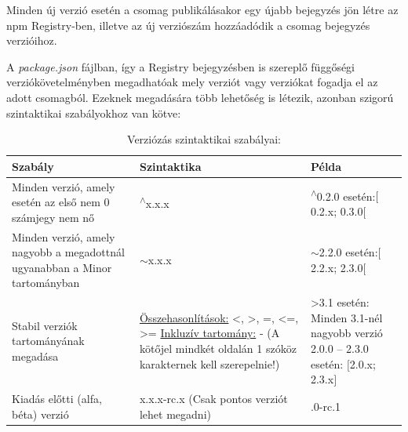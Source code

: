 	Minden új verzió esetén a csomag publikálásakor egy újabb bejegyzés jön létre az npm Registry-ben, illetve az új verziószám hozzáadódik a csomag bejegyzés verzióihoz.
	
	A \emph{package.json} fájlban, így a Registry bejegyzésben is szereplő függőségi verziókövetelményben megadhatóak mely verziót vagy verziókat fogadja el az adott csomagból. Ezeknek megadására több lehetőség is létezik, azonban szigorú szintaktikai szabályokhoz van kötve:
	\begin{table}[h]
		\centering
		\caption{Verziózás szintaktikai szabályai:}
		\label{tab:sem-ver-pt1}
	\begin{tabularx}{\textwidth} { 
			| >{\centering\arraybackslash}X 
			| >{\centering\arraybackslash}X 
			| >{\centering\arraybackslash}X | }
		\hline
		\textbf{Szabály} & \textbf{Szintaktika} & \textbf{Példa} \\
		\hline
		Minden verzió, amely esetén az első nem 0 számjegy nem nő & \textsuperscript{$\wedge$}x.x.x & \textsuperscript{$\wedge$}0.2.0 esetén:\newline $\big[$0.2.x; 0.3.0$\big[$ \\
		\hline
		Minden verzió, amely nagyobb a megadottnál ugyanabban a Minor tartományban & $\sim$x.x.x & $\sim$2.2.0 esetén:\newline $\big[$2.2.x; 2.3.0$\big[$  \\
		\hline
		Stabil verziók tartományának megadása & \underline{Összehasonlítások:} <, >, =, <=, >= \underline{Inkluzív tartomány:} - (A kötőjel mindkét oldalán 1 szóköz karakternek kell szerepelnie!) & >3.1 esetén: \newline Minden 3.1-nél nagyobb verzió 2.0.0 – 2.3.0 esetén: $\big[$2.0.x; 2.3.x$\big]$ \\
		\hline
		Kiadás előtti (alfa, béta) verzió & x.x.x-rc.x (Csak pontos verziót lehet megadni) & 1.0.0-rc.1 \\
		\hline 
	\end{tabularx}
	\end{table}

	\clearpage

